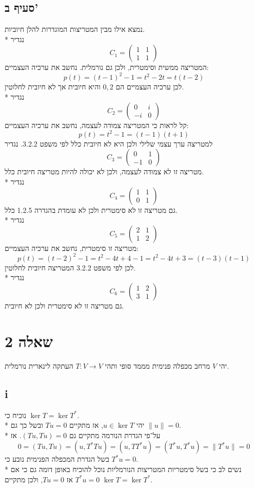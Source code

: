 \subsection{סעיף ב'}
נמצא אילו מבין המטריצות המוגדרות להלן חיוביות. \\*
נגדיר
\[
	C_1 = \begin{pmatrix}
		1 & 1 \\
		1 & 1
	\end{pmatrix}
\]
המטריצה ממשית וסימטרית, ולכן גם נורמלית. נחשב את ערכיה העצמיים:
\[
	p(t) = (t - 1)^2 - 1 = t^2 - 2t = t(t - 2)
\]
לכן ערכיה העצמיים הם $0, 2$ והיא חיובית אך לא חיובית לחלוטין. \\*
נגדיר
\[
	C_2 = \begin{pmatrix}
		0 & i \\
		-i & 0
	\end{pmatrix}
\]
קל לראות כי המטריצה צמודה לעצמה, נחשב את ערכיה העצמיים:
\[
	p(t) = t^2 - 1 = (t - 1)(t + 1)
\]
למטריצה ערך עצמי שלילי ולכן היא לא חיובית כלל לפי משפט 3.2.2.
נגדיר
\[
	C_3 = \begin{pmatrix}
		0 & 1 \\
		-1 & 0
	\end{pmatrix}
\]
מטריצה זו לא צמודה לעצמה, ולכן לא יכולה להיות מטריצה חיובית כלל. \\*
נגדיר
\[
	C_4 = \begin{pmatrix}
		1 & 1 \\
		0 & 1
	\end{pmatrix}
\]
גם מטריצה זו לא סימטרית ולכן לא עומדת בהגדרה 1.2.5 כלל. \\*
נגדיר
\[
	C_5 = \begin{pmatrix}
		2 & 1 \\
		1 & 2
	\end{pmatrix}
\]
מטריצה זו סימטרית, נחשב את ערכיה העצמיים:
\[
	p(t) = (t - 2)^2 - 1 = t^2 - 4t + 4 - 1 = t^2 - 4t + 3 = (t - 3)(t - 1)
\]
לכן לפי משפט 3.2.2 המטריצה חיובית לחלוטין. \\*
נגדיר
\[
	C_6 = \begin{pmatrix}
		1 & 2 \\
		3 & 1
	\end{pmatrix}
\]
גם מטריצה זו לא סימטרית ולכן לא חיובית.

\section{שאלה 2}
יהי $V$ מרחב מכפלה פנימית מממד סופי ותהי $T: V \to V$ העתקה לינארית נורמלית.
\subsection{i}
נוכיח כי $\ker T = \ker T^*$. \\*
יהי $u \in \ker T$, אז מתקיים $T u = 0$ ובשל כך גם $\lVert u \rVert = 0$. \\*
על־פי הגדרת הנורמה מתקיים גם $(T u, T u) = 0$. אז
\[
	0 = (T u, T u) = (u, T^* T u) = (u, T T^* u) = (T^* u, T^* u) = \lVert T^* u \rVert = 0
\]
בשל הגדרת המכפלה הפנימית נובע כי $T^* u = 0$. \\*
נשים לב כי בשל סימטריות המטריצות הנורמליות נוכל להוכיח באופן דומה גם כי אם $T^* u = 0$ אז $T u = 0$,
ולכן מתקיים $\ker T = \ker T^*$.

